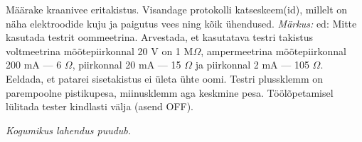 
Määrake kraanivee eritakistus. Visandage protokolli katseskeem(id), millelt on näha elektroodide kuju ja paigutus vees ning kõik ühendused.
\textit{Märkus:} ed: Mitte kasutada testrit oommeetrina. Arvestada, et kasutatava testri takistus voltmeetrina mõõtepiirkonnal 20 V on 1 M$\Omega$, ampermeetrina mõõtepiirkonnal 200 mA --- 6 $\Omega$, piirkonnal 20 mA --- 15 $\Omega$ ja piirkonnal 2 mA --- 105 $\Omega$. Eeldada, et patarei sisetakistus ei ületa ühte oomi. Testri plussklemm on parempoolne pistikupesa, miinusklemm aga keskmine pesa. Töölõpetamisel lülitada tester kindlasti välja (asend OFF).

\hint

\solu
\textit{Kogumikus lahendus puudub.}
\probend
